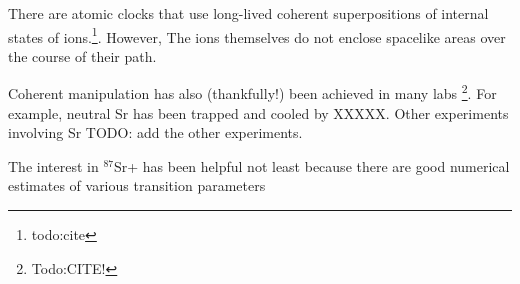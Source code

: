 There are atomic clocks that use long-lived coherent superpositions of internal states of ions.\footnote{todo:cite}. However, The ions themselves do not enclose spacelike areas over the course of their path.

Coherent manipulation has also (thankfully!) been achieved in many labs \footnote{Todo:CITE!}. For example, neutral Sr has been trapped and cooled by XXXXX. 
Other experiments involving Sr TODO: add the other experiments.

The interest in $^{87}$Sr+ has been helpful not least because there are good numerical estimates of various transition parameters \cite{safronovaTheory}


